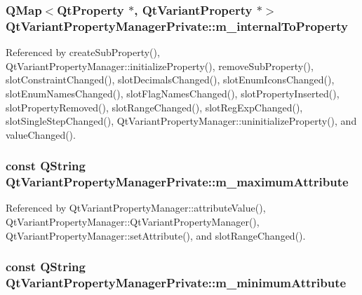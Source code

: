 \subsubsection[{m\+\_\+internal\+To\+Property}]{\setlength{\rightskip}{0pt plus 5cm}Q\+Map$<${\bf Qt\+Property} $\ast$, {\bf Qt\+Variant\+Property} $\ast$$>$ Qt\+Variant\+Property\+Manager\+Private\+::m\+\_\+internal\+To\+Property}\label{classQtVariantPropertyManagerPrivate_a9fdf587de8ebae67ad39b912d454982d}


Referenced by create\+Sub\+Property(), Qt\+Variant\+Property\+Manager\+::initialize\+Property(), remove\+Sub\+Property(), slot\+Constraint\+Changed(), slot\+Decimals\+Changed(), slot\+Enum\+Icons\+Changed(), slot\+Enum\+Names\+Changed(), slot\+Flag\+Names\+Changed(), slot\+Property\+Inserted(), slot\+Property\+Removed(), slot\+Range\+Changed(), slot\+Reg\+Exp\+Changed(), slot\+Single\+Step\+Changed(), Qt\+Variant\+Property\+Manager\+::uninitialize\+Property(), and value\+Changed().

\subsubsection[{m\+\_\+maximum\+Attribute}]{\setlength{\rightskip}{0pt plus 5cm}const Q\+String Qt\+Variant\+Property\+Manager\+Private\+::m\+\_\+maximum\+Attribute}\label{classQtVariantPropertyManagerPrivate_af2e3122bc19e54726b62c38eb753b86b}


Referenced by Qt\+Variant\+Property\+Manager\+::attribute\+Value(), Qt\+Variant\+Property\+Manager\+::\+Qt\+Variant\+Property\+Manager(), Qt\+Variant\+Property\+Manager\+::set\+Attribute(), and slot\+Range\+Changed().

\subsubsection[{m\+\_\+minimum\+Attribute}]{\setlength{\rightskip}{0pt plus 5cm}const Q\+String Qt\+Variant\+Property\+Manager\+Private\+::m\+\_\+minimum\+Attribute}\label{classQtVariantPropertyManagerPrivate_a3ec2a691b8c6756e5f042981b6ad4efd}


